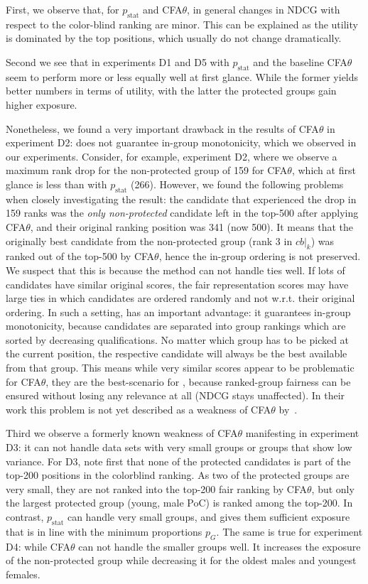 First, we observe that, for \algoFAIR $p_{\text{stat}}$ and CFA$\theta$, in general changes in NDCG with respect to the color-blind ranking are minor.
%
This can be explained as the utility is dominated by the top positions, which usually do not change dramatically.

Second we see that in experiments D1 and D5 \algoFAIR with $p_{\text{stat}}$ and the baseline CFA$\theta$ seem to perform more or less equally well at first glance.
%
While the former yields better numbers in terms of utility, with the latter the protected groups gain higher exposure.

Nonetheless, we found a very important drawback in the results of CFA$\theta$ in experiment D2: \citet{zehlike2020matching} does not guarantee in-group monotonicity, which we observed in our experiments.
%
Consider, for example, experiment D2, where we observe a maximum rank drop for the non-protected group of 159 for CFA$\theta$, which at first glance is less than \algoFAIR with $p_{\text{stat}}$ (266).
%
However, we found the following problems when closely investigating the result: the candidate that experienced the drop in 159 ranks was the \emph{only non-protected} candidate left in the top-500 after applying CFA$\theta$, and their original ranking position was 341 (now 500).
%
It means that the originally best candidate from the non-protected group (rank 3 in $cb|_k$) was ranked out of the top-500 by CFA$\theta$, hence the in-group ordering is not preserved.
%
We suspect that this is because the method can not handle ties well.
%
If lots of candidates have similar original scores, the fair representation scores may have large ties in which candidates are ordered randomly and not w.r.t. their original ordering.
%
In such a setting, \algoFAIR has an important advantage: it guarantees in-group monotonicity, because candidates are separated into group rankings which are sorted by decreasing qualifications.
%
No matter which group has to be picked at the current position, the respective candidate will always be the best available from that group.
%
This means while very similar scores appear to be problematic for CFA$\theta$, they are the best-scenario for \algoFAIR, because ranked-group fairness can be ensured without losing any relevance at all (NDCG stays unaffected).
%
In their work this problem is not yet described as a weakness of CFA$\theta$ by~\citet{zehlike2020matching}.

Third we observe a formerly known weakness of CFA$\theta$ manifesting in experiment D3: it can not handle data sets with very small groups or groups that show low variance.
%
For D3, note first that none of the protected candidates is part of the top-200 positions in the colorblind ranking.
%
As two of the protected groups are very small, they are not ranked into the top-200 fair ranking by CFA$\theta$, but only the largest protected group (young, male PoC) is ranked among the top-200.
%
In contrast, \algoFAIR $p_{\text{stat}}$ can handle very small groups, and gives them sufficient exposure that is in line with the minimum proportions $p_G$.
%
The same is true for experiment D4: while CFA$\theta$ can not handle the smaller groups well.
%
It increases the exposure of the non-protected group while decreasing it for the oldest males and youngest females.

